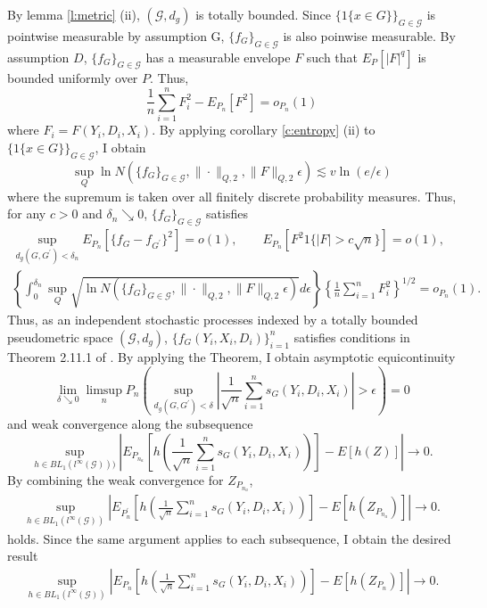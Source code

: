 \documentclass[12pt,oneside,reqno,english]{amsart}
\def\sumn{\sum_{i=1}^{n}}
\theoremstyle{definition}
\begin{document}
By lemma \ref{l:metric} (ii), $(\mathcal{G},d_{g})$ is totally bounded. 
Since $\{1\{x\in G\}\}_{ G\in \mathcal{G} }$ is pointwise measurable by assumption G, $\{f_{G}\}_{G\in\mathcal{G}}$ is also poinwise measurable.  
By assumption $D$, $\{f_{G}\}_{G\in \mathcal{G}}$ has a measurable envelope $F$ such that $E_{P}[|F|^{q}]$ is bounded uniformly over $P$.  
Thus, 
\[\frac{1}{n}\sumn F^{2}_{i}-E_{P_{n}}[F^{2}]=o_{P_{n}}(1)\]
where $F_{i}=F(Y_{i},D_{i},X_{i})$.  
By applying corollary \ref{c:entropy} (ii) to $\{1\{x\in G\}\}_{G\in \mathcal{G}}$, I obtain 
\[\sup_{Q}\ln N(\{f_{G}\}_{G\in \mathcal{G}},\|\cdot\|_{Q,2},\|F\|_{Q,2}\epsilon)\lesssim v\ln(e/\epsilon)\] 
where the supremum is taken over all finitely discrete probability measures. Thus, for any $c>0$ and $\delta_{n}\searrow 0$, 
$\{f_{G}\}_{G\in \mathcal{G}}$ satisfies
\begin{align*}
\sup_{d_{g}(G,G^{\prime})<\delta_{n}}E_{P_{n}}[\{f_{G}-f_{G^{\prime}}\}^{2}]=o(1),\qquad E_{P_{n}}[F^{2}1\{|F|>c\sqrt{n}\}]=o(1),\\
\left\{\int^{\delta_{n}}_{0} \sup_{Q}\sqrt{\ln N(\{f_{G}\}_{G\in \mathcal{G}},\|\cdot\|_{Q,2},\|F\|_{Q,2}\epsilon)}d\epsilon\right\}\left\{\frac{1}{n}\sumn F^{2}_{i}\right\}^{1/2} =o_{P_{n}}(1).
\end{align*}
Thus, as an independent stochastic processes indexed by a totally bounded pseudometric space $(\mathcal{G},d_{g})$, $\{f_{G}(Y_{i},X_{i},D_{i})\}_{i=1}^{n}$ satisfies conditions in Theorem 2.11.1 of \cite{VW:96}. By applying the Theorem, I obtain asymptotic equicontinuity
\[\lim_{\delta\searrow 0} \limsup_{n}P_{n}\left( \sup_{d_{g}(G,G^{\prime})<\delta} \left| \frac{1}{\sqrt{n}}\sum_{i=1}^{n}s_{G}(Y_{i},D_{i},X_{i})\right| >\epsilon \right)=0\]
and weak convergence along the subsequence
\[\sup_{h\in BL_{1}(l^{\infty}(\mathcal{G})))}\left|E_{P_{n_{a}}}\left[h\left(\frac{1}{\sqrt{n}}\sum_{i=1}^{n}s_{G}(Y_{i},D_{i},X_{i})\right)\right]-E[h(Z)]\right|
\rightarrow 0.\]
By combining the weak convergence for $Z_{P_{n_{a}}}$,
\begin{align*}
\sup_{h\in BL_{1}(l^{\infty}(\mathcal{G}))}\left|E_{P_{n}^{\prime}}\left[h\left(\frac{1}{\sqrt{n}}\sum_{i=1}^{n}s_{G}(Y_{i},D_{i},X_{i})\right)\right]-E[h(Z_{P_{n_{a}}})]\right|\rightarrow 0. 
\end{align*}
holds. Since the same argument applies to each subsequence, I obtain the desired result 
\begin{align*}
\sup_{h\in BL_{1}(l^{\infty}(\mathcal{G}))}\left|E_{P_{n}}\left[h\left(\frac{1}{\sqrt{n}}\sum_{i=1}^{n}s_{G}(Y_{i},D_{i},X_{i})\right)\right]-E[h(Z_{P_{n}})]\right|\rightarrow 0. 
\end{align*}
\end{document}
